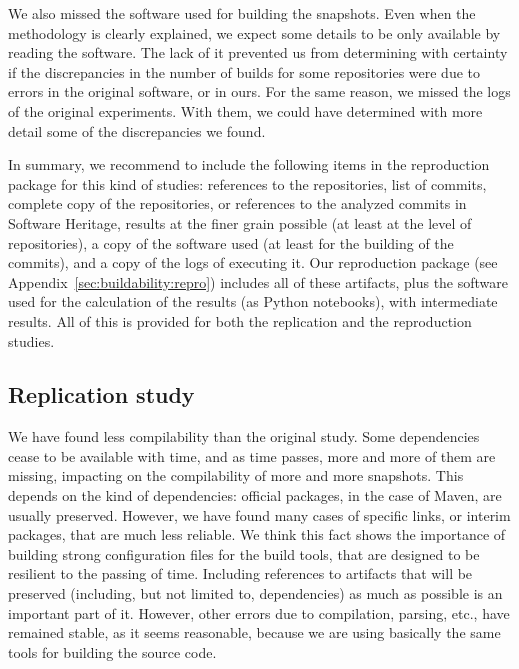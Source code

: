 We also missed the software used for building the snapshots. Even when the methodology is clearly explained, we expect some details to be only available by reading the software. The lack of it prevented us from determining with certainty if the discrepancies in the number of builds for some repositories were due to errors in the original software, or in ours. For the same reason, we missed the logs of the original experiments. With them, we could have determined with more detail some of the discrepancies we found.

In summary, we recommend to include the following items in the reproduction package for this kind of studies: references to the repositories, list of commits, complete copy of the repositories, or references to the analyzed commits in Software Heritage, results at the finer grain possible (at least at the level of repositories), a copy of the software used (at least for the building of the commits), and a copy of the logs of executing it. Our reproduction package (see Appendix~\ref{sec:buildability:repro}) includes all of these artifacts, plus the software used for the calculation of the results (as Python notebooks), with intermediate results. All of this is provided for both the replication and the reproduction studies.

\subsection{Replication study}

We have found less compilability than the original study. Some dependencies cease to be available with time, and as time passes, more and more of them are missing, impacting on the compilability of more and more snapshots. This depends on the kind of dependencies: official packages, in the case of Maven, are usually preserved. However, we have found many cases of specific links, or interim packages, that are much less reliable. We think this fact shows the importance of building strong configuration files for the build tools, that are designed to be resilient to the passing of time. Including references to artifacts that will be preserved (including, but not limited to, dependencies) as much as possible is an important part of it.
However, other errors due to compilation, parsing, etc., have remained stable, as it seems reasonable, because we are using basically the same tools for building the source code.

